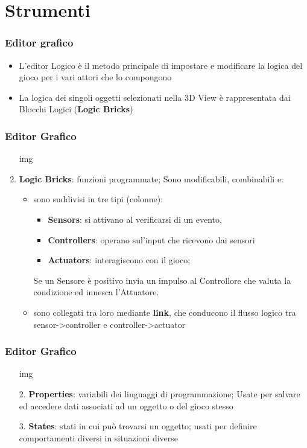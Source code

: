 \documentclass{beamer}
\begin{document}
	\section{Strumenti}
		\begin{frame}
			\frametitle{Editor grafico}
			\begin{itemize}
				\item L'editor Logico è il metodo principale di impostare e modificare la logica del gioco per i vari attori che lo compongono
				\item La logica dei singoli oggetti selezionati nella 3D View è rappresentata dai Blocchi Logici (\textbf{Logic Bricks})
			\end{itemize}
		\end{frame}
		\begin{frame}
			\frametitle{Editor Grafico}
			\begin{enumerate}
			\item [img]
				\item \textbf{Logic Bricks}: funzioni programmate; Sono modificabili, combinabili e:
					\begin{itemize}
						\item sono suddivisi in tre tipi (colonne): 
						\begin{itemize}
							\item\textbf{Sensors}: \footnotesize si attivano al verificarsi di un evento, 
							\item \textbf{Controllers}: \footnotesize operano sul'input che ricevono dai sensori
							\item \textbf{Actuators}: \footnotesize interagiscono con il gioco;
						\end{itemize}
						Se un Sensore è positivo invia un impulso al Controllore che valuta la condizione ed innesca l’Attuatore.
						\item sono collegati tra loro mediante \textbf{link}, che conducono il flusso logico tra sensor->controller e controller->actuator
					\end{itemize}
			\end{enumerate}
		\end{frame}
		\begin{frame}
			\frametitle{Editor Grafico}
			\begin{itemize}
			\item [img]
				\item[2.] \textbf{Properties}: variabili dei linguaggi di programmazione; Usate per salvare ed accedere dati associati ad un oggetto o del gioco stesso
				\item[3.] \textbf{States}: stati in cui può trovarsi un oggetto; usati per definire comportamenti diversi in situazioni diverse %
			\end{itemize}
		\end{frame}
\end{document}
